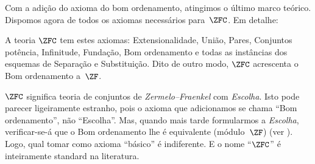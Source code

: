 \documentclass[../../../include/open-logic-section]{subfiles}
\begin{document}

Com a adição do axioma do bom ordenamento, atingimos o último
marco teórico. Dispomos agora de todos os axiomas necessários para~$\ZFC$.
Em detalhe:

\begin{defn}
A teoria $\ZFC$ tem estes axiomas: Extensionalidade, União, Pares,
Conjuntos potência, Infinitude, Fundação, Bom ordenamento e todas as instâncias dos esquemas de Separação e Substituição. Dito de outro modo, $\ZFC$ acrescenta
o Bom ordenamento a~$\ZF$.
\end{defn}

$\ZFC$ significa teoria de conjuntos de \emph{Zermelo--Fraenkel} com
\emph{Escolha}. Isto pode parecer ligeiramente estranho, pois o axioma
que adicionamos se chama ``Bom ordenamento'', não ``Escolha''. Mas, quando mais tarde
formularmos a \emph{Escolha}, verificar-se-á que o Bom ordenamento lhe é equivalente
(módulo~$\ZF$) (ver ).
Logo, qual tomar como axioma ``básico'' é indiferente.
E o nome ``$\ZFC$'' é inteiramente standard na literatura.
\end{document}
